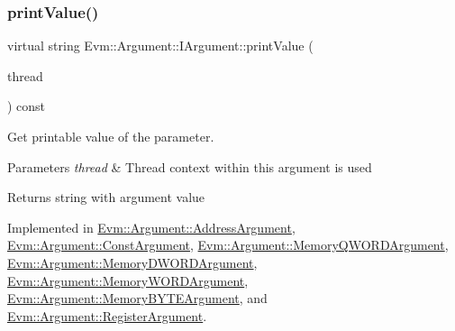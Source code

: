 \subsubsection{\texorpdfstring{print\+Value()}{printValue()}}
{\footnotesize\ttfamily virtual string Evm\+::\+Argument\+::\+I\+Argument\+::print\+Value (\begin{DoxyParamCaption}\item[{\mbox{\hyperlink{struct_evm_1_1_thread_context}{Thread\+Context}} \&}]{thread }\end{DoxyParamCaption}) const\hspace{0.3cm}{\ttfamily [pure virtual]}}



Get printable value of the parameter. 


\begin{DoxyParams}{Parameters}
{\em thread} & Thread context within this argument is used \\
\hline
\end{DoxyParams}
\begin{DoxyReturn}{Returns}
string with argument value 
\end{DoxyReturn}


Implemented in \mbox{\hyperlink{struct_evm_1_1_argument_1_1_address_argument_afaefa598d24c588a0047df1b88033bbd}{Evm\+::\+Argument\+::\+Address\+Argument}}, \mbox{\hyperlink{struct_evm_1_1_argument_1_1_const_argument_a5741f701088fadebf19b733c6973898b}{Evm\+::\+Argument\+::\+Const\+Argument}}, \mbox{\hyperlink{struct_evm_1_1_argument_1_1_memory_q_w_o_r_d_argument_a428099eec7efa97b28a07f9b4d1a257b}{Evm\+::\+Argument\+::\+Memory\+Q\+W\+O\+R\+D\+Argument}}, \mbox{\hyperlink{struct_evm_1_1_argument_1_1_memory_d_w_o_r_d_argument_adea7b11736aa7af73ad702e6aaf6e464}{Evm\+::\+Argument\+::\+Memory\+D\+W\+O\+R\+D\+Argument}}, \mbox{\hyperlink{struct_evm_1_1_argument_1_1_memory_w_o_r_d_argument_ac8c383d86bde6ef724583560bd0436e0}{Evm\+::\+Argument\+::\+Memory\+W\+O\+R\+D\+Argument}}, \mbox{\hyperlink{struct_evm_1_1_argument_1_1_memory_b_y_t_e_argument_a7fbed3cafe6784094617c522a2c91412}{Evm\+::\+Argument\+::\+Memory\+B\+Y\+T\+E\+Argument}}, and \mbox{\hyperlink{struct_evm_1_1_argument_1_1_register_argument_a68e1690a92a7e7844fd89cc9b2dd3a6c}{Evm\+::\+Argument\+::\+Register\+Argument}}.

\mbox{\label{struct_evm_1_1_argument_1_1_i_argument_a24e4c76f2750e664e3895d2ff4b9146d}} 
